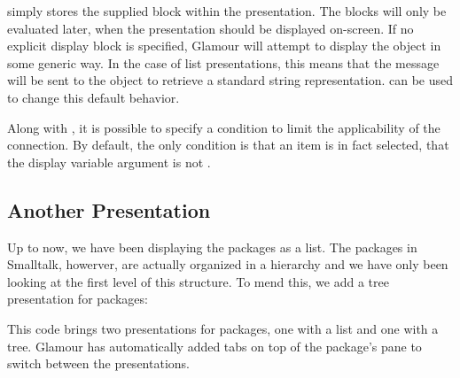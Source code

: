 \documentclass[a4paper,10pt,twoside]{book}
\begin{document}
 simply stores the supplied block within the
presentation. The blocks will only be evaluated later, when the
presentation should be displayed on-screen. If no explicit display
block is specified, Glamour will attempt to display the object in some
generic way. In the case of list presentations, this means that the
 message will be sent to the object to retrieve a
standard string representation.  can be used to change
this default behavior.

Along with , it is possible to specify a 
condition to limit the applicability of the connection. By default,
the only condition is that an item is in fact selected, \ie{} that the
display variable argument is not .

\subsection{Another Presentation}

Up to now, we have been displaying the packages as a list. The
packages in Smalltalk, howerver, are actually organized in a hierarchy
and we have only been looking at the first level of this structure. To
mend this, we add a tree presentation for packages:



This code brings two presentations for packages, one with a list and
one with a tree. Glamour has automatically added tabs on top of the
package's pane to switch between the presentations.
\end{document}
